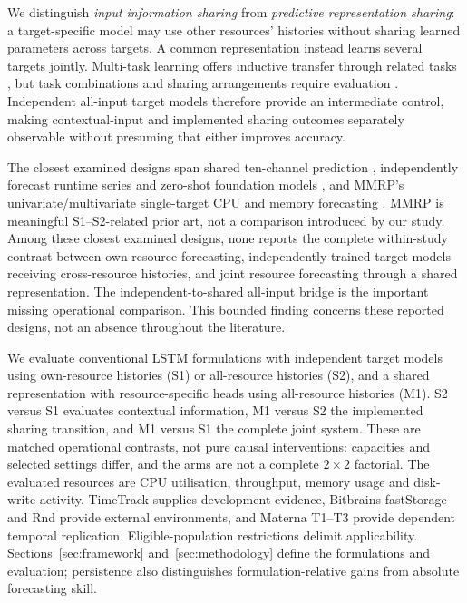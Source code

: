 \documentclass[a4paper,fleqn]{cas-dc}
\begin{document}
We distinguish \emph{input information sharing} from \emph{predictive
representation sharing}: a target-specific model may use other resources'
histories without sharing learned parameters across targets. A common
representation instead learns several targets jointly. Multi-task learning
offers inductive transfer through related tasks \citep{Caruana1997Multitask},
but task combinations and sharing arrangements require evaluation
\citep{Standley2020TaskGrouping,Fifty2021TaskGroupings,Nochumsohn2025MTLinear}.
Independent all-input target models therefore provide an intermediate control,
making contextual-input and implemented sharing outcomes separately observable
without presuming that either improves accuracy.

The closest examined designs span shared ten-channel prediction
\citep{Ullah2023CloudBiLSTM}, independently forecast runtime series and
zero-shot foundation models \citep{DiMenna2026RuntimeForecasting}, and MMRP's
univariate/multivariate single-target CPU and memory forecasting
\citep{Tripathi2025MMRP}. MMRP is meaningful S1--S2-related prior art, not a
comparison introduced by our study. Among these closest examined designs,
none reports the complete within-study contrast between own-resource
forecasting, independently trained target models receiving cross-resource histories,
and joint resource forecasting through a shared representation. The
independent-to-shared all-input bridge is the important missing operational
comparison. This bounded finding concerns these reported designs, not an
absence throughout the literature.

We evaluate conventional LSTM formulations with independent target models
using own-resource histories (S1) or all-resource histories (S2), and a shared
representation with resource-specific heads using all-resource histories
(M1). S2 versus S1 evaluates contextual information, M1
versus S2 the implemented sharing transition, and M1 versus S1 the complete
joint system. These are matched operational contrasts, not pure causal
interventions: capacities and selected settings differ, and the arms are not
a complete $2\times2$ factorial. The evaluated resources are CPU utilisation,
throughput, memory usage and disk-write activity. TimeTrack supplies
development evidence, Bitbrains fastStorage and Rnd provide external
environments, and Materna T1--T3 provide dependent temporal replication.
Eligible-population restrictions delimit applicability. Sections~\ref{sec:framework}
and~\ref{sec:methodology} define the formulations and evaluation; persistence
also distinguishes formulation-relative gains from absolute forecasting skill.
\end{document}
